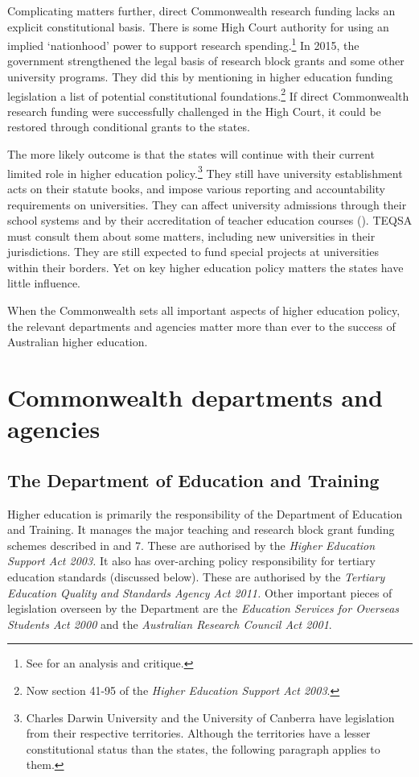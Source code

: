 \documentclass{grattan}
\begin{document}
Complicating matters further, direct Commonwealth research funding lacks an explicit constitutional basis. There is some High Court authority for using an implied `nationhood' power to support research spending.\footnote{See \textcite[][]{Twomey2010pushingtheboundar} for an analysis and critique.} In 2015, the government strengthened the legal basis of research block grants and some other university programs. They did this by mentioning in higher education funding legislation a list of potential constitutional foundations.\footnote{Now section 41-95 of the \emph{Higher Education Support Act 2003}.} If direct Commonwealth research funding were successfully challenged in the High Court, it could be restored through conditional grants to the states.

The more likely outcome is that the states will continue with their current limited role in higher education policy.\footnote{Charles Darwin University and the University of Canberra have legislation from their respective territories. Although the territories have a lesser constitutional status than the states, the following paragraph applies to them.} They still have university establishment acts on their statute books, and impose various reporting and accountability requirements on universities. They can affect university admissions through their school systems and by their accreditation of teacher education courses (). TEQSA must consult them about some matters, including new universities in their jurisdictions. They are still expected to fund special projects at universities within their borders. Yet on key higher education policy matters the states have little influence.

When the Commonwealth sets all important aspects of higher education policy, the relevant departments and agencies matter more than ever to the success of Australian higher education.

%
\section{Commonwealth departments and agencies}\label{sec:commonwealth-departments-and-agencies}

%
\subsection{The Department of Education and Training}\label{subsec:the-department-of-education-and-training}

Higher education is primarily the responsibility of the Department of Education and Training. It manages the major teaching and research block grant funding schemes described in  and 7. These are authorised by the \emph{Higher Education Support Act 2003.} It also has over-arching policy responsibility for tertiary education standards (discussed below). These are authorised by the \emph{Tertiary Education Quality and Standards Agency Act 2011.} Other important pieces of legislation overseen by the Department are the \emph{Education Services for Overseas Students Act 2000} and the \emph{Australian Research Council Act 2001}.
\end{document}
